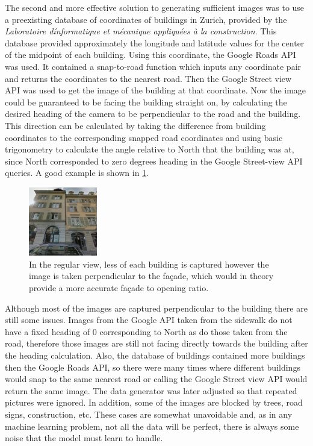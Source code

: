 \documentclass[10pt,conference,compsocconf]{IEEEtran}
\begin{document}
The second and more effective solution to generating sufficient images was to use a preexisting database of coordinates of buildings in Zurich, provided by the \textit{Laboratoire dínformatique et mécanique appliquées à la construction}. This database provided approximately the longitude and latitude values for the center of the midpoint of each building. Using this coordinate, the Google Roads API was used. It contained a snap-to-road function which inputs any coordinate pair and returns the coordinates to the nearest road. Then the Google Street view API was used to get the image of the building at that coordinate. Now the image could be guaranteed to be facing the building straight on, by calculating the desired heading of the camera to be perpendicular to the road and the building. This direction can be calculated by taking the difference from building coordinates to the corresponding snapped road coordinates and using basic trigonometry to calculate the angle relative to North that the building was at, since North corresponded to zero degrees heading in the Google Street-view API queries.  A good example is shown in \ref{fig:finalImg}.

\begin{figure}[h!]
  \centering
  \includegraphics[height=30mm]{final_img_example.png}
  \vspace{-5mm}
  \caption{In the regular view, less of each building is captured however the image is taken perpendicular to the façade, which would in theory provide a more accurate façade to opening ratio.}
  \label{fig:finalImg}
\end{figure}

Although most of the images are captured perpendicular to the building there are still some issues. Images from the Google API taken from the sidewalk do not have a fixed heading of 0 corresponding to North as do those taken from the road, therefore those images are still not facing directly towards the building after the heading calculation. Also, the database of buildings contained more buildings then the Google Roads API, so there were many times where different buildings would snap to the same nearest road or calling the Google Street view API would return the same image. The data generator was later adjusted so that repeated pictures were ignored. In addition, some of the images are blocked by trees, road signs, construction, etc. These cases are somewhat unavoidable and, as in any machine learning problem, not all the data will be perfect, there is always some noise that the model must learn to handle.
\end{document}
